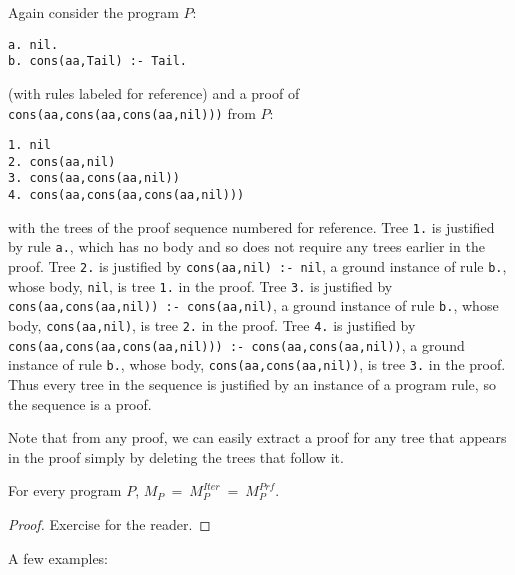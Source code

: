 \begin{example}
Again consider the program $P$:
\begin{verbatim}
a. nil.
b. cons(aa,Tail) :- Tail.
\end{verbatim}
(with rules labeled for reference)
and a proof of \verb|cons(aa,cons(aa,cons(aa,nil)))| from $P$:
\begin{verbatim}
1. nil
2. cons(aa,nil)
3. cons(aa,cons(aa,nil))
4. cons(aa,cons(aa,cons(aa,nil)))
\end{verbatim}
with the trees of the proof sequence numbered for reference.
Tree \verb|1.| is justified by rule \verb|a.|, which has
no body and so does not require any trees earlier in the proof.
Tree \verb|2.| is justified by
\verb|cons(aa,nil) :- nil|, a ground instance of rule \verb|b.|,
whose body, \verb|nil|, is tree \verb|1.| in the proof.  
Tree \verb|3.| is justified by
\verb|cons(aa,cons(aa,nil)) :- cons(aa,nil)|, a ground instance of rule \verb|b.|,
whose body, \verb|cons(aa,nil)|, is tree \verb|2.| in the proof.  
Tree \verb|4.| is justified by
\verb|cons(aa,cons(aa,cons(aa,nil))) :- cons(aa,cons(aa,nil))|,
a ground instance of rule \verb|b.|,
whose body, \verb|cons(aa,cons(aa,nil))|, is tree \verb|3.| in the proof.
Thus every tree in the sequence is justified by an instance of a
program rule, so the sequence is a proof.
\end{example}

Note that from any proof, we can easily extract a proof for any tree
that appears in the proof simply by deleting the trees that follow
it.

\begin{theorem}
For every program $P$, $M_P~=~M_P^{Iter}~=~M_P^{Prf}$.
\end{theorem}

\begin{proof}
  Exercise for the reader.
\end{proof}

A few examples:

